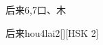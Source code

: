 \begin{entry}{后来}{6,7}{⼝、⽊}
  \begin{phonetics}{后来}{hou4lai2}[][HSK 2]
  \end{phonetics}
\end{entry}
